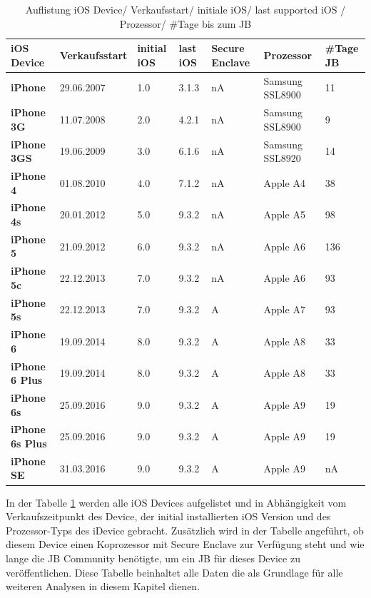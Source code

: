 \begin{table}[htp!]
    \begin{center}
        \begin{tabular}{|p{30mm}|p{27mm}|p{12mm}|p{10mm}|p{18mm}|p{2cm}|p{15mm}|} \hline
            \textbf{iOS Device} & \textbf{Verkaufsstart} & \textbf{initial iOS} & \textbf{last iOS} & \textbf{Secure Enclave} & \textbf{Prozessor}  & \textbf{\#Tage JB} \\ \hline
            \textbf{iPhone} & 29.06.2007  & 1.0 & 3.1.3 & nA & Samsung SSL8900 & 11\\ \hline
            \textbf{iPhone 3G} & 11.07.2008 & 2.0 & 4.2.1 & nA & Samsung SSL8900 & 9\\ \hline
            \textbf{iPhone 3GS} & 19.06.2009 & 3.0 & 6.1.6 & nA & Samsung SSL8920 & 14\\ \hline
            \textbf{iPhone 4} & 01.08.2010 & 4.0 & 7.1.2 & nA & Apple A4 & 38 \\ \hline
            \textbf{iPhone 4s} & 20.01.2012 & 5.0 & 9.3.2 & nA & Apple A5 & 98 \\ \hline 
            \textbf{iPhone 5} & 21.09.2012 & 6.0 &  9.3.2 & nA & Apple A6 & 136 \\ \hline
            \textbf{iPhone 5c} & 22.12.2013 & 7.0 & 9.3.2 & nA & Apple A6 & 93 \\ \hline
            \textbf{iPhone 5s} & 22.12.2013 & 7.0 & 9.3.2 & A & Apple A7 & 93 \\ \hline
            \textbf{iPhone 6} & 19.09.2014 & 8.0 & 9.3.2 & A & Apple A8 & 33\\ \hline
            \textbf{iPhone 6 Plus} & 19.09.2014 & 8.0 & 9.3.2 &  A & Apple A8 & 33\\ \hline
            \textbf{iPhone 6s} & 25.09.2016 & 9.0 &  9.3.2 & A & Apple A9 & 19\\ \hline
            \textbf{iPhone 6s Plus} & 25.09.2016 & 9.0 & 9.3.2 &  A & Apple A9 & 19\\ \hline
            \textbf{iPhone SE} & 31.03.2016 & 9.0 &  9.3.2 & A & Apple A9 & nA\\ \hline  
        \end{tabular} 
        \caption{Auflistung iOS Device/ Verkaufsstart/ initiale iOS/ last supported iOS / Prozessor/ \#Tage bis zum JB}
        \label{tab:iOSHW}
    \end{center}
\end{table}

In der Tabelle \ref{tab:iOSHW} werden alle iOS Devices aufgelistet und  in Abhängigkeit vom Verkaufszeitpunkt des Device, der initial installierten iOS Version und des Prozessor-Typs des iDevice gebracht. Zusätzlich wird in der Tabelle angeführt, ob diesem Device einen Koprozessor mit Secure Enclave zur Verfügung steht und wie lange die JB Community benötigte, um ein JB für dieses Device zu veröffentlichen. Diese Tabelle beinhaltet alle Daten die als Grundlage für alle weiteren Analysen in diesem Kapitel dienen.\par

